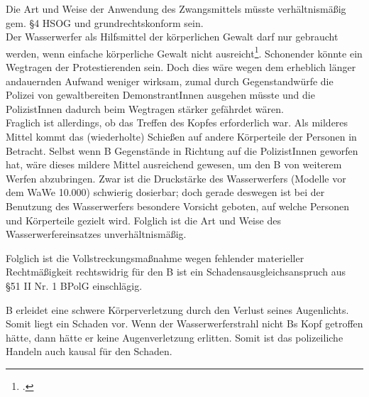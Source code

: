 \documentclass[widefront, ngerman]{jura}
\begin{document}
Die Art und Weise der Anwendung des Zwangsmittels müsste verhältnismäßig gem. §4 HSOG und grundrechtskonform sein.\\
Der Wasserwerfer als Hilfsmittel der körperlichen Gewalt darf nur gebraucht werden, wenn einfache körperliche Gewalt nicht ausreicht\footcite[Rn 407]{Goetz}. Schonender könnte ein Wegtragen der Protestierenden sein. Doch dies wäre wegen dem erheblich länger andauernden Aufwand weniger wirksam, zumal durch Gegenstandwürfe die Polizei von gewaltbereiten DemonstrantInnen ausgehen müsste und die PolizistInnen dadurch beim Wegtragen stärker gefährdet wären.\\
Fraglich ist allerdings, ob das Treffen des Kopfes erforderlich war. Als milderes Mittel kommt das (wiederholte) Schießen auf andere Körperteile der Personen in Betracht. Selbst wenn B Gegenstände in Richtung auf die PolizistInnen geworfen hat, wäre dieses mildere Mittel ausreichend gewesen, um den B von weiterem Werfen abzubringen. Zwar ist die Druckstärke des Wasserwerfers (Modelle vor dem WaWe 10.000) schwierig dosierbar; doch gerade deswegen ist bei der Benutzung des Wasserwerfers besondere Vorsicht geboten, auf welche Personen und Körperteile gezielt wird. Folglich ist die Art und Weise des Wasserwerfereinsatzes unverhältnismäßig.


\levelup{}
Folglich ist die Vollstreckungsmaßnahme wegen fehlender materieller Rechtmäßigkeit rechtswidrig für den B ist ein Schadensausgleichsanspruch aus §51 II Nr. 1 BPolG einschlägig.

\levelup{}
B erleidet eine schwere Körperverletzung durch den Verlust seines Augenlichts. Somit liegt ein Schaden vor. Wenn der Wasserwerferstrahl %
nicht Bs Kopf getroffen hätte, dann hätte er keine Augenverletzung erlitten. Somit ist das polizeiliche Handeln auch kausal für den Schaden.
\end{document}
